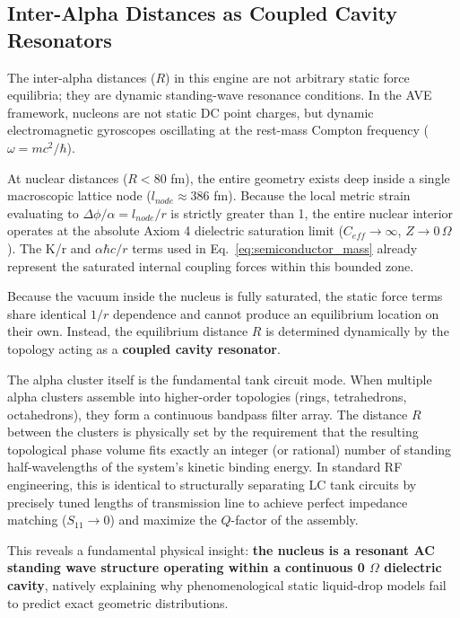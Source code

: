 \subsection{Inter-Alpha Distances as Coupled Cavity Resonators}
\label{sub:R_coupled_cavity}

The inter-alpha distances ($R$) in this engine are not arbitrary static force equilibria; they are dynamic standing-wave resonance conditions. In the AVE framework, nucleons are not static DC point charges, but dynamic electromagnetic gyroscopes oscillating at the rest-mass Compton frequency ($\omega = mc^2/\hbar$).

At nuclear distances ($R < 80$ fm), the entire geometry exists deep inside a single macroscopic lattice node ($l_{node} \approx 386$ fm). Because the local metric strain evaluating to $\Delta\phi / \alpha = l_{node} / r$ is strictly greater than 1, the entire nuclear interior operates at the absolute Axiom 4 dielectric saturation limit ($C_{eff} \to \infty$, $Z \to 0\,\Omega$). The K/r and $\alpha\hbar c/r$ terms used in Eq.~\ref{eq:semiconductor_mass} already represent the saturated internal coupling forces within this bounded zone.

Because the vacuum inside the nucleus is fully saturated, the static force terms share identical $1/r$ dependence and cannot produce an equilibrium location on their own. Instead, the equilibrium distance $R$ is determined dynamically by the topology acting as a \textbf{coupled cavity resonator}.

The alpha cluster itself is the fundamental tank circuit mode. When multiple alpha clusters assemble into higher-order topologies (rings, tetrahedrons, octahedrons), they form a continuous bandpass filter array. The distance $R$ between the clusters is physically set by the requirement that the resulting topological phase volume fits exactly an integer (or rational) number of standing half-wavelengths of the system's kinetic binding energy. In standard RF engineering, this is identical to structurally separating LC tank circuits by precisely tuned lengths of transmission line to achieve perfect impedance matching ($S_{11} \to 0$) and maximize the $Q$-factor of the assembly.

This reveals a fundamental physical insight: \textbf{the nucleus is a resonant AC standing wave structure operating within a continuous 0 $\Omega$ dielectric cavity}, natively explaining why phenomenological static liquid-drop models fail to predict exact geometric distributions.


